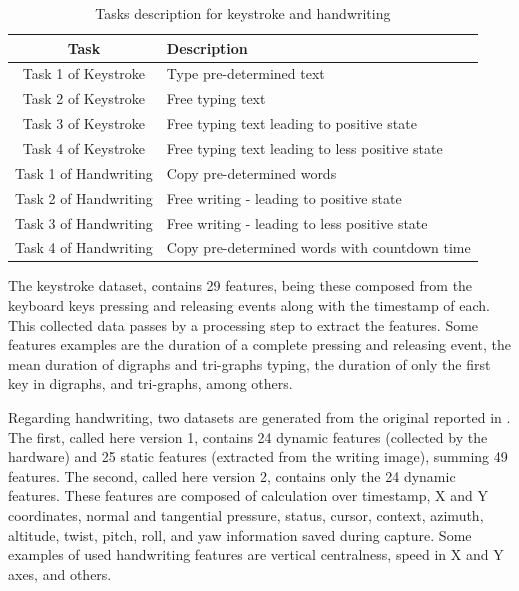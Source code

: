 \documentclass[conference]{IEEEtran}
\begin{document}
\begin{table}[htbp]
    \centering
    \caption{Tasks description for keystroke and handwriting}
    \label{tab:tasks}
    \setlength{\tabcolsep}{3.5pt}
    \begin{tabular}{|c|l|}
        \hline
         \textbf{Task} & \textbf{Description} \\ \hline
         Task 1 of Keystroke & Type pre-determined text \\ \hline
         Task 2 of Keystroke & Free typing text \\ \hline
         Task 3 of Keystroke & Free typing text leading to positive state \\ \hline
         Task 4 of Keystroke & Free typing text leading to less positive state \\ \hline
         Task 1 of Handwriting & Copy pre-determined words \\ \hline
         Task 2 of Handwriting & Free writing - leading to positive state \\ \hline
         Task 3 of Handwriting & Free writing - leading to less positive state \\ \hline
         Task 4 of Handwriting & Copy pre-determined words with countdown time \\ \hline
    \end{tabular}
\end{table}


The keystroke dataset, contains 29 features, being these composed from the keyboard keys pressing and releasing events along with the timestamp of each.
This collected data passes by a processing step to extract the features. Some features examples are the duration of a complete pressing and releasing event, the mean duration of digraphs and tri-graphs typing, the duration of only the first key in digraphs, and tri-graphs, among others.

Regarding handwriting, two datasets are generated from the original reported in \cite{cheng-thesis}. The first, called here version 1, contains 24 dynamic features (collected by the hardware) and 25 static features (extracted from the writing image), summing 49 features. The second, called here version 2, contains only the 24 dynamic features.
These features are composed of calculation over timestamp, X and Y coordinates, normal and tangential pressure, status, cursor, context, azimuth, altitude, twist, pitch, roll, and yaw information saved during capture. Some examples of used handwriting features are vertical centralness, speed in X and Y axes, and others.
\end{document}
